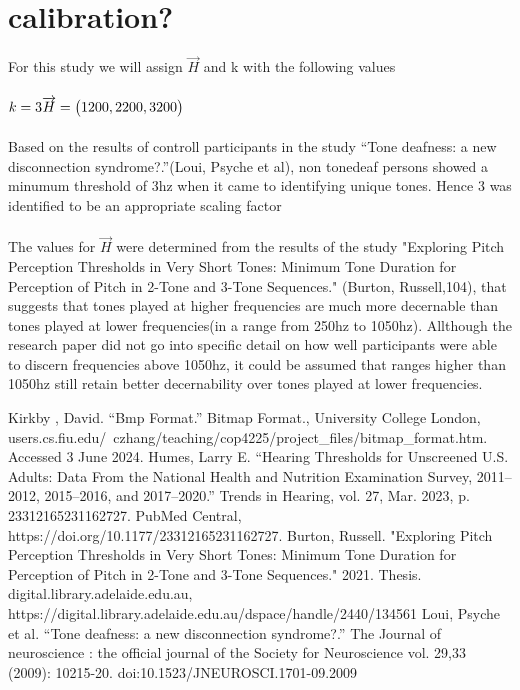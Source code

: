 \documentclass[]{article}
\begin{document}
\section{calibration?}
For this study we will assign \begin{math} \overrightarrow{H} \end{math} and k with the following values
\\\\
\begin{math}
    k = 3 \\
    \overrightarrow{H} = \begin{pmatrix} 1200,2200,3200 \end{pmatrix}\\
\end{math}
\\\\
Based on the results of controll participants in the study “Tone deafness: a new disconnection syndrome?.”(Loui, Psyche et al),
non tonedeaf persons showed a minumum threshold of 3hz when it came to identifying unique tones. Hence 3 was identified to be an appropriate scaling factor 
\\\\
The values for \begin{math} \overrightarrow{H} \end{math} were determined from the results of the study "Exploring Pitch Perception Thresholds in Very Short Tones: 
Minimum Tone Duration for Perception of Pitch in 2-Tone and 3-Tone Sequences." (Burton, Russell,104), that suggests that tones played at higher frequencies
are much more decernable than tones played at lower frequencies(in a range from 250hz to 1050hz). Allthough the research paper did not go into specific detail on
how well participants were able to discern frequencies above 1050hz, it could be assumed that ranges higher than 1050hz still retain better decernability over tones
played at lower frequencies.

\begin{thebibliography}{9}
Kirkby , David. “Bmp Format.” Bitmap Format., University College London, users.cs.fiu.edu/~czhang/teaching/cop4225/project_files/bitmap_format.htm. Accessed 3 June 2024.
Humes, Larry E. “Hearing Thresholds for Unscreened U.S. Adults: Data From the National Health and Nutrition Examination Survey, 2011–2012, 2015–2016, and 2017–2020.” Trends in Hearing, vol. 27, Mar. 2023, p. 23312165231162727. PubMed Central, https://doi.org/10.1177/23312165231162727.
Burton, Russell. "Exploring Pitch Perception Thresholds in Very Short Tones: Minimum Tone Duration for Perception of Pitch in 2-Tone and 3-Tone Sequences." 2021. Thesis. digital.library.adelaide.edu.au, https://digital.library.adelaide.edu.au/dspace/handle/2440/134561
Loui, Psyche et al. “Tone deafness: a new disconnection syndrome?.” The Journal of neuroscience : the official journal of the Society for Neuroscience vol. 29,33 (2009): 10215-20. doi:10.1523/JNEUROSCI.1701-09.2009
\end{thebibliography}
\end{document}
